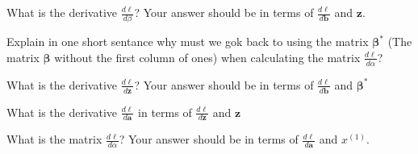 \documentclass[11pt]{exam}
\numberwithin{equation}{section} %
\numberwithin{figure}{section} %
\numberwithin{table}{section} %
\newcommand{\av}{\mathbf{a}}
\newcommand{\bv}{\mathbf{b}}
\newcommand{\zv}{\mathbf{z}}
\newcommand{\betav      }{\boldsymbol \beta      }
\begin{document}
\begin{enumerate}
\begin{questions}
	        
	        
	        \question[1] What is the derivative $\frac{d\ell}{d\beta}$? Your answer should be in terms of $\frac{d\ell}{d\bv}$ and $\zv$.
	        
	        
	        \begin{tcolorbox}[fit,height=3cm, width=6cm, blank, borderline={1pt}{-2pt}]
	        \end{tcolorbox}
	        
	        
	        
	        
	        \question[1] Explain in one short sentance why must we gok back to using the matrix $\betav^*$ (The matrix $\betav$ without the first column of ones) when calculating the matrix $\frac{d\ell}{d\alpha}$?
	        
	        
	        \begin{tcolorbox}[fit,height=1cm, width=15cm, blank, borderline={1pt}{-2pt}]
	        \end{tcolorbox}
	        
	        
	        
	        
	        \question[1] What is the derivative $\frac{d\ell}{d\zv}$? Your answer should be in terms of $\frac{d\ell}{d\bv}$ and $\betav^*$
	        
	        
	        \begin{tcolorbox}[fit,height=3cm, width=6cm, blank, borderline={1pt}{-2pt}]
	        \end{tcolorbox}
	        
	        
	        
	        
	        \question[3] What is the derivative $\frac{d\ell}{d\av}$ in terms of $\frac{d\ell}{d\zv}$ and $\zv$
	        
	        
	        \begin{tcolorbox}[fit,height=3cm, width=6cm, blank, borderline={1pt}{-2pt}]
	        \end{tcolorbox}
	        
	        
	        
	        \question[1] What is the matrix $\frac{d\ell}{d\alpha}$? Your answer should be in terms of $\frac{d\ell}{d\av}$ and $x^{(1)}$.
	        
	        
	        \begin{tcolorbox}[fit,height=3cm, width=6cm, blank, borderline={1pt}{-2pt}]
	        \end{tcolorbox}
	        

\end{questions}
\end{enumerate}
\end{document}
